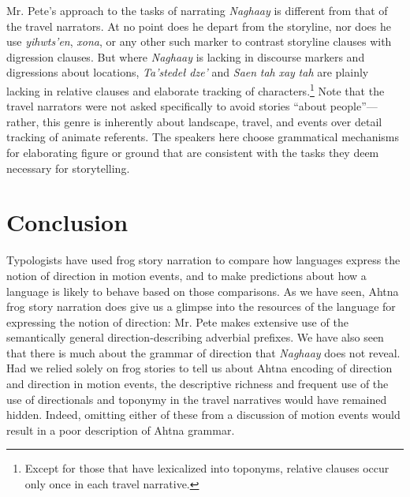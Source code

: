 Mr. Pete’s approach to the tasks of narrating \textit{Naghaay} is different from that of the travel narrators. At no point does he depart from the storyline, nor does he use \textit{yihwts’en}, \textit{xona}, or any other such marker to contrast storyline clauses with digression clauses. But where \textit{Naghaay} is lacking in discourse markers and digressions about locations, \textit{Ta’stedeł} \textit{dze’} and \textit{Saen} \textit{tah} \textit{xay} \textit{tah} are plainly lacking in relative clauses and elaborate tracking of characters.\footnote{Except for those that have lexicalized into toponyms, relative clauses occur only once in each travel narrative.} Note that the travel narrators were not asked specifically to avoid stories “about people”—rather, this genre is inherently about landscape, travel, and events over detail tracking of animate referents. The speakers here choose grammatical mechanisms for elaborating figure or ground that are consistent with the tasks they deem necessary for storytelling.

\section{Conclusion}

Typologists have used frog story narration to compare how languages express the notion of direction in motion events, and to make predictions about how a language is likely to behave based on those comparisons. As we have seen, Ahtna frog story narration does give us a glimpse into the resources of the language for expressing the notion of direction: Mr. Pete makes extensive use of the semantically general direction-describing adverbial prefixes. We have also seen that there is much about the grammar of direction that \textit{Naghaay} does not reveal. Had we relied solely on frog stories to tell us about Ahtna encoding of direction and direction in motion events, the descriptive richness and frequent use of the use of directionals and toponymy in the travel narratives would have remained hidden. Indeed, omitting either of these from a discussion of motion events would result in a poor description of Ahtna grammar.

